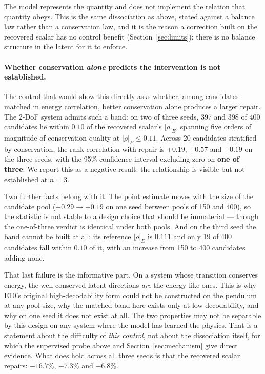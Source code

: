 The model represents the quantity and does not implement the relation that quantity obeys. This is
the same dissociation as above, stated against a balance law rather than a conservation law, and it
is the reason a correction built on the recovered scalar has no control benefit
(Section~\ref{sec:limits}): there is no balance structure in the latent for it to enforce.

\paragraph{Whether conservation \emph{alone} predicts the intervention is not established.}
The control that would show this directly asks whether, among candidates matched in energy
correlation, better conservation alone produces a larger repair. The 2-DoF system admits such a band:
on two of three seeds, 397 and 398 of 400 candidates lie within $0.10$ of the recovered scalar's
$|\rho|_E$, spanning five orders of magnitude of conservation quality at $|\rho|_E \le 0.11$. Across
20 candidates stratified by conservation, the rank correlation with repair is $+0.19$, $+0.57$ and
$+0.19$ on the three seeds, with the 95\% confidence interval excluding zero on \textbf{one of
three}. We report this as a negative result: the relationship is visible but not established at
$n = 3$.

Two further facts belong with it. The point estimate moves with the size of the candidate pool
($+0.29 \to +0.19$ on one seed between pools of 150 and 400), so the statistic is not stable to a
design choice that should be immaterial --- though the one-of-three verdict is identical under both
pools. And on the third seed the band cannot be built at all: its reference $|\rho|_E$ is $0.111$ and
only 19 of 400 candidates fall within $0.10$ of it, with an increase from 150 to 400 candidates
adding none.

That last failure is the informative part. On a system whose transition conserves energy, the
well-conserved latent directions \emph{are} the energy-like ones. This is why E10's original
high-decodability form could not be constructed on the pendulum at any pool size, why the matched
band here exists only at low decodability, and why on one seed it does not exist at all. The two
properties may not be separable by this design on any system where the model has learned the physics.
That is a statement about the difficulty of \emph{this control}, not about the dissociation itself,
for which the supervised probe above and Section~\ref{sec:mechanism} give direct evidence. What does
hold across all three seeds is that the recovered scalar repairs: $-16.7\%$, $-7.3\%$ and $-6.8\%$.
